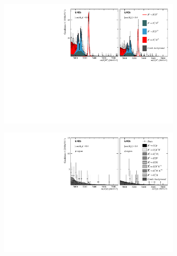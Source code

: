 \begin{figure}[!h]
    \centering
    \begin{subfigure}[t]{1.0\textwidth}
        \centering
        \includegraphics[width=1.0\textwidth]{figs/Appendix_FitCategories/canvas_DsD0_Ds2KPiPi_both_summed_splitHel_splitKKPi_s21_s21r1_s24_s26.pdf}\\
    \end{subfigure}
    \begin{subfigure}[t]{1.0\textwidth}
        \centering
        \includegraphics[width=1.0\textwidth]{figs/Appendix_FitCategories/canvas_DsPhi_Ds2KPiPi_both_summed_splitHel_splitKKPi_s21_s21r1_s24_s26.pdf}\\

\end{subfigure}
\end{figure}
